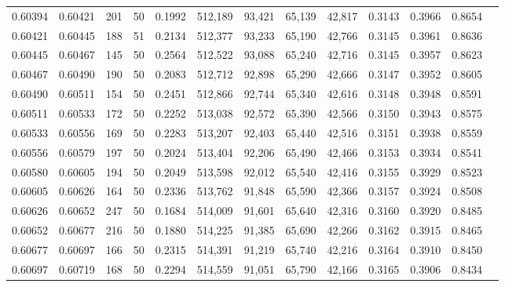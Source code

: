 \begin{tabular}{rrrrrrrrrrrrr}
0.60394 & 0.60421 &   201 &  50 &                                     0.1992 & 512,189 &  93,421 &  65,139 &  42,817 & 0.3143 & 0.3966 & 0.8654 \\
0.60421 & 0.60445 &   188 &  51 &                                     0.2134 & 512,377 &  93,233 &  65,190 &  42,766 & 0.3145 & 0.3961 & 0.8636 \\
0.60445 & 0.60467 &   145 &  50 &                                     0.2564 & 512,522 &  93,088 &  65,240 &  42,716 & 0.3145 & 0.3957 & 0.8623 \\
0.60467 & 0.60490 &   190 &  50 &                                     0.2083 & 512,712 &  92,898 &  65,290 &  42,666 & 0.3147 & 0.3952 & 0.8605 \\
0.60490 & 0.60511 &   154 &  50 &                                     0.2451 & 512,866 &  92,744 &  65,340 &  42,616 & 0.3148 & 0.3948 & 0.8591 \\
0.60511 & 0.60533 &   172 &  50 &                                     0.2252 & 513,038 &  92,572 &  65,390 &  42,566 & 0.3150 & 0.3943 & 0.8575 \\
0.60533 & 0.60556 &   169 &  50 &                                     0.2283 & 513,207 &  92,403 &  65,440 &  42,516 & 0.3151 & 0.3938 & 0.8559 \\
0.60556 & 0.60579 &   197 &  50 &                                     0.2024 & 513,404 &  92,206 &  65,490 &  42,466 & 0.3153 & 0.3934 & 0.8541 \\
0.60580 & 0.60605 &   194 &  50 &                                     0.2049 & 513,598 &  92,012 &  65,540 &  42,416 & 0.3155 & 0.3929 & 0.8523 \\
0.60605 & 0.60626 &   164 &  50 &                                     0.2336 & 513,762 &  91,848 &  65,590 &  42,366 & 0.3157 & 0.3924 & 0.8508 \\
0.60626 & 0.60652 &   247 &  50 &                                     0.1684 & 514,009 &  91,601 &  65,640 &  42,316 & 0.3160 & 0.3920 & 0.8485 \\
0.60652 & 0.60677 &   216 &  50 &                                     0.1880 & 514,225 &  91,385 &  65,690 &  42,266 & 0.3162 & 0.3915 & 0.8465 \\
0.60677 & 0.60697 &   166 &  50 &                                     0.2315 & 514,391 &  91,219 &  65,740 &  42,216 & 0.3164 & 0.3910 & 0.8450 \\
0.60697 & 0.60719 &   168 &  50 &                                     0.2294 & 514,559 &  91,051 &  65,790 &  42,166 & 0.3165 & 0.3906 & 0.8434 \\

\end{tabular}
